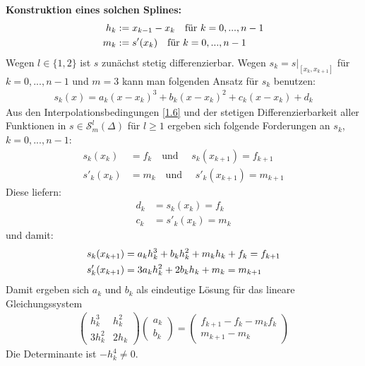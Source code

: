 \textbf{Konstruktion eines solchen Splines:}
\begin{align}
	h_k &:= x_{k-1}-x_k\quad\text{für } k=0,...,n-1 \notag \\
	m_k &:= s'(x_k) \quad\text{für } k=0,...,n-1\notag
\end{align}
Wegen $l\in\{1,2\}$ ist $s$ zunächst stetig differenzierbar. Wegen $s_k=s\vert_{[x_k,x_{k+1}]}$ für $k=0,...,n-1$ und $m=3$ kann man folgenden Ansatz für $s_k$ benutzen:
\begin{align}
	\label{1.7}
	s_k(x)=a_k(x-x_k)^3+b_k(x-x_k)^2+c_k(x-x_k)+d_k
\end{align}
Aus den Interpolationsbedingungen \cref{1.6} und der stetigen Differenzierbarkeit aller Funktionen in $s\in\mathcal{S}^l_m(\Delta)$ für $l\ge 1$ ergeben sich folgende Forderungen an $s_k$, $k=0,...,n-1$:
\begin{equation}
	\label{1.8}
	\begin{split}
		s_k(x_k) &= f_k \quad\text{und }\quad s_k(x_{k+1}) = f_{k+1} \\
		s'_k(x_k) &= m_k \quad\text{und }\quad s'_k(x_{k+1}) = m_{k+1}
	\end{split}
\end{equation}
Diese liefern:
\begin{equation}
	\label{1.9}
	\begin{split}
		d_k &= s_k(x_k)=f_k \\
		c_k &= s'_k(x_k)=m_k
	\end{split}
\end{equation}
und damit:
\begin{align}
	s_k(x_{k+1}) &= a_kh_k^3 + b_kh_k^2+m_kh_k + f_k = f_{k+1} \notag \\
	s'_k(x_{k+1}) &= 3a_kh_k^2 + 2b_kh_k + m_k = m_{k+1} \notag
\end{align}
Damit ergeben sich $a_k$ und $b_k$ als eindeutige Lösung für das lineare Gleichungssystem
\begin{align}
	\label{1.10}
	\begin{pmatrix}
		h_k^3 & h_k^2 \\ 3h_k^2 & 2h_k
	\end{pmatrix}
	\begin{pmatrix}
		a_k \\ b_k
	\end{pmatrix}=
	\begin{pmatrix}
		f_{k+1}-f_k-m_kf_k \\
		m_{k+1}-m_k
	\end{pmatrix}
\end{align}
Die Determinante ist $-h_k^4\neq 0$.